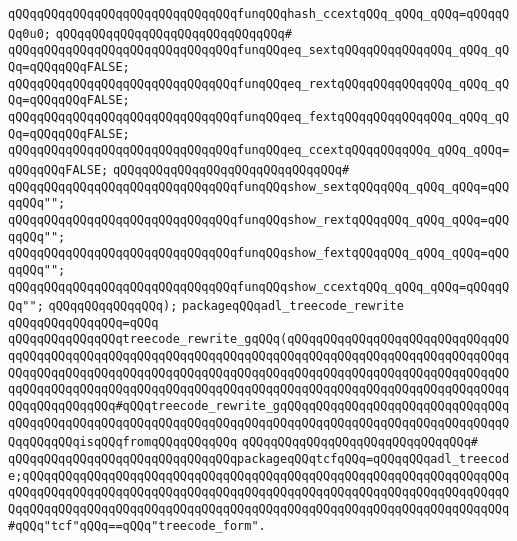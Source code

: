 \verb|qQQqqQQqqQQqqQQqqQQqqQQqqQQqqQQqfunqQQqhash_ccextqQQq_qQQq_qQQq=qQQqqQQq0u0;|\newline
\verb|qQQqqQQqqQQqqQQqqQQqqQQqqQQqqQQq#|\newline
\verb|qQQqqQQqqQQqqQQqqQQqqQQqqQQqqQQqfunqQQqeq_sextqQQqqQQqqQQqqQQq_qQQq_qQQq=qQQqqQQqFALSE;|\newline
\verb|qQQqqQQqqQQqqQQqqQQqqQQqqQQqqQQqfunqQQqeq_rextqQQqqQQqqQQqqQQq_qQQq_qQQq=qQQqqQQqFALSE;|\newline
\verb|qQQqqQQqqQQqqQQqqQQqqQQqqQQqqQQqfunqQQqeq_fextqQQqqQQqqQQqqQQq_qQQq_qQQq=qQQqqQQqFALSE;|\newline
\verb|qQQqqQQqqQQqqQQqqQQqqQQqqQQqqQQqfunqQQqeq_ccextqQQqqQQqqQQq_qQQq_qQQq=qQQqqQQqFALSE;|\newline
\verb|qQQqqQQqqQQqqQQqqQQqqQQqqQQqqQQq#|\newline
\verb|qQQqqQQqqQQqqQQqqQQqqQQqqQQqqQQqfunqQQqshow_sextqQQqqQQq_qQQq_qQQq=qQQqqQQq"";|\newline
\verb|qQQqqQQqqQQqqQQqqQQqqQQqqQQqqQQqfunqQQqshow_rextqQQqqQQq_qQQq_qQQq=qQQqqQQq"";|\newline
\verb|qQQqqQQqqQQqqQQqqQQqqQQqqQQqqQQqfunqQQqshow_fextqQQqqQQq_qQQq_qQQq=qQQqqQQq"";|\newline
\verb|qQQqqQQqqQQqqQQqqQQqqQQqqQQqqQQqfunqQQqshow_ccextqQQq_qQQq_qQQq=qQQqqQQq"";|\newline
\verb|qQQqqQQqqQQqqQQq);|\newline
\newline
\verb|packageqQQqadl_treecode_rewrite|\newline
\verb|qQQqqQQqqQQqqQQq=qQQq|\newline
\verb|qQQqqQQqqQQqqQQqtreecode_rewrite_gqQQq(qQQqqQQqqQQqqQQqqQQqqQQqqQQqqQQqqQQqqQQqqQQqqQQqqQQqqQQqqQQqqQQqqQQqqQQqqQQqqQQqqQQqqQQqqQQqqQQqqQQqqQQqqQQqqQQqqQQqqQQqqQQqqQQqqQQqqQQqqQQqqQQqqQQqqQQqqQQqqQQqqQQqqQQqqQQqqQQqqQQqqQQqqQQqqQQqqQQqqQQqqQQqqQQqqQQqqQQqqQQqqQQqqQQqqQQqqQQqqQQqqQQqqQQqqQQqqQQq#qQQqtreecode_rewrite_gqQQqqQQqqQQqqQQqqQQqqQQqqQQqqQQqqQQqqQQqqQQqqQQqqQQqqQQqqQQqqQQqqQQqqQQqqQQqqQQqqQQqqQQqqQQqqQQqqQQqqQQqqQQqqQQqisqQQqfromqQQqqQQqqQQq|\newline
\verb|qQQqqQQqqQQqqQQqqQQqqQQqqQQqqQQq#|\newline
\verb|qQQqqQQqqQQqqQQqqQQqqQQqqQQqqQQqpackageqQQqtcfqQQq=qQQqqQQqadl_treecode;qQQqqQQqqQQqqQQqqQQqqQQqqQQqqQQqqQQqqQQqqQQqqQQqqQQqqQQqqQQqqQQqqQQqqQQqqQQqqQQqqQQqqQQqqQQqqQQqqQQqqQQqqQQqqQQqqQQqqQQqqQQqqQQqqQQqqQQqqQQqqQQqqQQqqQQqqQQqqQQqqQQqqQQqqQQqqQQqqQQqqQQqqQQqqQQqqQQqqQQqqQQqqQQq#qQQq"tcf"qQQq==qQQq"treecode_form".|\newline

